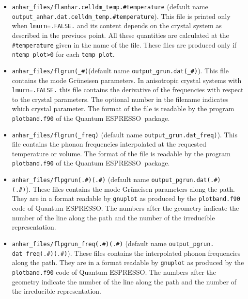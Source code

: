 \documentclass[12pt,a4paper,twoside]{report}
\def\qe{{\sc Quantum ESPRESSO}}
\begin{document}
\begin{itemize}
\item 
\texttt{anhar\_files/flanhar.celldm\_temp.\#temperature} 
(default name \\ \texttt{output\_anhar.dat.celldm\_temp.\#temperature}). 
This file is printed
only when \texttt{lmurn=.FALSE.} and its content depends on the crystal 
system as described in the previuos point. 
All these quantities are calculated at the \texttt{\#temperature} given
in the name of the file.
These files are produced only if \texttt{ntemp\_plot>0} for each
\texttt{temp\_plot}. 

\item 
\texttt{anhar\_files/flgrun(\_\#)}(default name 
\texttt{output\_grun.dat(\_\#)}). This file contains the mode Gr\"uneisen
parameters. In anisotropic crystal systems with \texttt{lmurn=.FALSE.} this
file contains the derivative of the frequencies with respect to the
crystal parameters. The optional number in the filename indicates which
crystal parameter. The format of the file is readable by the program
\texttt{plotband.f90} of the \qe\ package.

\item 
\texttt{anhar\_files/flgrun(\_freq)} 
(default name \texttt{output\_grun.dat\_freq)}).
This file contains the phonon frequencies interpolated at the requested 
temperature or volume. The format of the file is readable by the program
\texttt{plotband.f90} of the \qe\ package.

\item 
\texttt{anhar\_files/flpgrun(.\#)(.\#)} 
(default name \texttt{output\_pgrun.dat(.\#)} \\ \texttt{(.\#)}).
These files contains the mode Gr\"uneisen parameters along the path.
They are in a format readable by \texttt{gnuplot} as produced by 
the \texttt{plotband.f90} code of \qe. The numbers after the geometry indicate the number of the line 
along the path and the number of the irreducible representation.

\item 
\texttt{anhar\_files/flpgrun\_freq(.\#)(.\#)} 
(default name \texttt{output\_pgrun.} \\ \texttt{dat\_freq(.\#)(.\#)}).
These files contains the interpolated phonon frequencies along the path.
They are in a format readable by \texttt{gnuplot} as produced by 
the \texttt{plotband.f90} code of \qe. The numbers after the geometry indicate the number of the line 
along the path and the number of the irreducible representation.


\end{itemize}
\end{document}

